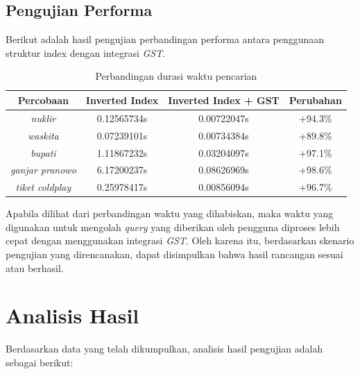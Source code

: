 \subsection{Pengujian Performa}

Berikut adalah hasil pengujian perbandingan performa antara penggunaan struktur 
index dengan integrasi \textit{GST}.

\begin{table}[H]
\begin{center}
  \caption{\label{tabel:perbandingan_performa} Perbandingan durasi waktu 
  pencarian}
\begin{tabular}{|c|c|c|c|} 
 \hline
  Percobaan & Inverted Index & Inverted Index + GST & Perubahan \\ 
 \hline
  \textit{nuklir} & 0.12565734s & 0.00722047s & +94.3\% \\ 
  \textit{waskita} & 0.07239101s & 0.00734384s & +89.8\% \\
  \textit{bupati} & 1.11867232s & 0.03204097s & +97.1\% \\
  \textit{ganjar pranowo} & 6.17200237s & 0.08626969s & +98.6\% \\ 
  \textit{tiket coldplay} & 0.25978417s & 0.00856094s & +96.7\% \\
 \hline
\end{tabular}
\end{center}
\end{table}

Apabila dilihat dari perbandingan waktu yang dihabiskan, maka waktu yang 
digunakan untuk mengolah \textit{query} yang diberikan oleh pengguna diproses 
lebih cepat dengan menggunakan integrasi \textit{GST}. Oleh karena itu, 
berdasarkan skenario pengujian yang direncanakan, dapat disimpulkan bahwa hasil 
rancangan sesuai atau berhasil.

\section{Analisis Hasil}

Berdasarkan data yang telah dikumpulkan, analisis hasil pengujian adalah sebagai 
berikut:

